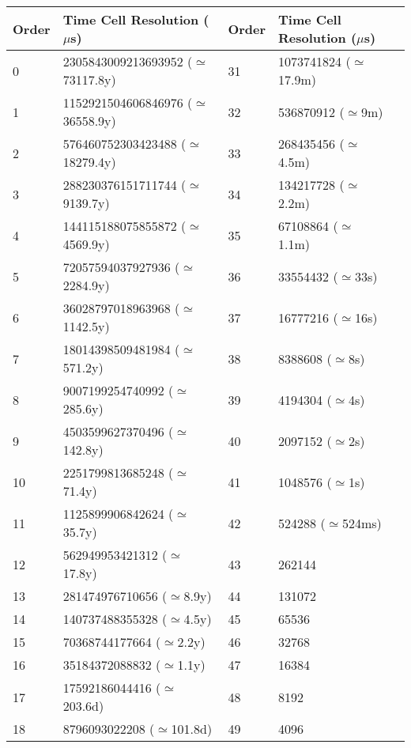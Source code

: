 
\begin{table}[!htbp]
\smallskip
\begin{center}
   {\scriptsize
   \begin{tabular} {|l | l| l| l| l|}
   \hline
   Order & Time Cell Resolution ($\mu$s)  & Order & Time Cell Resolution ($\mu$s) \\
   \hline
0       &       2305843009213693952 ($\simeq$73117.8y) 	& 31   & 1073741824 ($\simeq$17.9m) \\
1       &       1152921504606846976 ($\simeq$36558.9y) 	& 32   & 536870912 ($\simeq$9m) \\
2       &       576460752303423488 ($\simeq$18279.4y)	& 33   & 268435456 ($\simeq$4.5m) \\
3       &       288230376151711744 ($\simeq$9139.7y)	& 34   & 134217728 ($\simeq$2.2m) \\
4       &       144115188075855872 ($\simeq$4569.9y)	& 35   & 67108864 ($\simeq$1.1m) \\
5       &       72057594037927936 ($\simeq$2284.9y)	& 36   & 33554432 ($\simeq$33s) \\
6       &       36028797018963968 ($\simeq$1142.5y)	& 37   & 16777216 ($\simeq$16s) \\
7       &       18014398509481984 ($\simeq$571.2y)	& 38   & 8388608 ($\simeq$8s) \\
8       &       9007199254740992 ($\simeq$285.6y)	& 39   & 4194304 ($\simeq$4s) \\
9       &       4503599627370496 ($\simeq$142.8y)	& 40   & 2097152 ($\simeq$2s) \\
10      &       2251799813685248 ($\simeq$71.4y)	& 41   & 1048576 ($\simeq$1s) \\
11      &       1125899906842624 ($\simeq$35.7y)	& 42   & 524288 ($\simeq$524ms) \\
12      &       562949953421312 ($\simeq$17.8y)		& 43   & 262144 \\
13      &       281474976710656 ($\simeq$8.9y)		& 44   & 131072 \\
14      &       140737488355328 ($\simeq$4.5y)		& 45   & 65536 \\
15      &       70368744177664 ($\simeq$2.2y)		& 46   & 32768 \\
16      &       35184372088832 ($\simeq$1.1y)		& 47   & 16384 \\
17      &       17592186044416 ($\simeq$203.6d)		& 48   & 8192 \\
18      &       8796093022208   ($\simeq$101.8d)	& 49   & 4096 \\

\end{tabular}}
\end{center}
\end{table}
